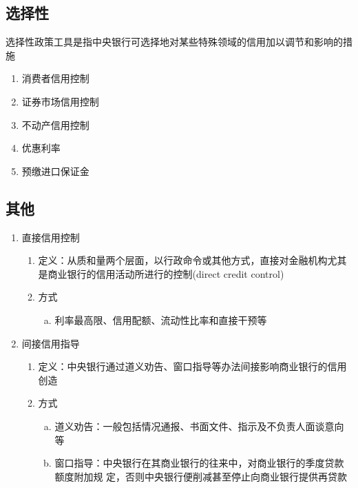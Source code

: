 \documentclass[12pt]{book}
\begin{document}
\subsection{选择性}

选择性政策工具是指中央银行可选择地对某些特殊领域的信用加以调节和影响的措施 

\begin{enumerate}[1.]
  \item 消费者信用控制
  \item 证券市场信用控制
  \item 不动产信用控制
  \item 优惠利率
  \item 预缴进口保证金
\end{enumerate}



\subsection{其他}

\begin{enumerate}[1.]
  \item 直接信用控制
        \begin{enumerate}[(1)]
          \item 定义：从质和量两个层面，以行政命令或其他方式，直接对金融机构尤其是商业银行的信用活动所进行的控制(direct credit control)
          \item 方式
                \begin{enumerate}[a.]
                  \item 利率最高限、信用配额、流动性比率和直接干预等
                \end{enumerate}
        \end{enumerate}
  \item 间接信用指导
        \begin{enumerate}[(1)]
          \item 定义：中央银行通过道义劝告、窗口指导等办法间接影响商业银行的信用创造
          \item 方式
                \begin{enumerate}[a.]
                  \item 道义劝告：一般包括情况通报、书面文件、指示及不负责人面谈意向等
                  \item 窗口指导：中央银行在其商业银行的往来中，对商业银行的季度贷款额度附加规 定，否则中央银行便削减甚至停止向商业银行提供再贷款
                \end{enumerate}
        \end{enumerate}
\end{enumerate}
\end{document}
